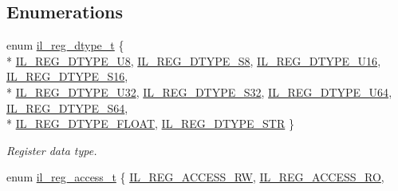 \subsection*{Enumerations}
\begin{DoxyCompactItemize}
\item 
enum \hyperlink{group__IL__REGS_gaddd7edef254d348f2e8a48c40840cdd6}{il\+\_\+reg\+\_\+dtype\+\_\+t} \{ \\*
\hyperlink{group__IL__REGS_ggaddd7edef254d348f2e8a48c40840cdd6afebd31a475c6cb6b6c9ac200fd90a09b}{I\+L\+\_\+\+R\+E\+G\+\_\+\+D\+T\+Y\+P\+E\+\_\+\+U8}, 
\hyperlink{group__IL__REGS_ggaddd7edef254d348f2e8a48c40840cdd6a4d3f76f5e0e716d7b358d819691e834a}{I\+L\+\_\+\+R\+E\+G\+\_\+\+D\+T\+Y\+P\+E\+\_\+\+S8}, 
\hyperlink{group__IL__REGS_ggaddd7edef254d348f2e8a48c40840cdd6a4776d418653151a6cadd41574d631bfa}{I\+L\+\_\+\+R\+E\+G\+\_\+\+D\+T\+Y\+P\+E\+\_\+\+U16}, 
\hyperlink{group__IL__REGS_ggaddd7edef254d348f2e8a48c40840cdd6a3eb3b654856f84234168d58355e83a85}{I\+L\+\_\+\+R\+E\+G\+\_\+\+D\+T\+Y\+P\+E\+\_\+\+S16}, 
\\*
\hyperlink{group__IL__REGS_ggaddd7edef254d348f2e8a48c40840cdd6a3d299c6c4bbda29b3286a3483271ee90}{I\+L\+\_\+\+R\+E\+G\+\_\+\+D\+T\+Y\+P\+E\+\_\+\+U32}, 
\hyperlink{group__IL__REGS_ggaddd7edef254d348f2e8a48c40840cdd6aaf16d13caf933d3e002054de7a0f1c48}{I\+L\+\_\+\+R\+E\+G\+\_\+\+D\+T\+Y\+P\+E\+\_\+\+S32}, 
\hyperlink{group__IL__REGS_ggaddd7edef254d348f2e8a48c40840cdd6a5a0f02c573b8800ee8f113160ce93712}{I\+L\+\_\+\+R\+E\+G\+\_\+\+D\+T\+Y\+P\+E\+\_\+\+U64}, 
\hyperlink{group__IL__REGS_ggaddd7edef254d348f2e8a48c40840cdd6a37398082dc9828038d3403ca24a28d5a}{I\+L\+\_\+\+R\+E\+G\+\_\+\+D\+T\+Y\+P\+E\+\_\+\+S64}, 
\\*
\hyperlink{group__IL__REGS_ggaddd7edef254d348f2e8a48c40840cdd6a07e3bbcf6a1d00d8f62887e41b529239}{I\+L\+\_\+\+R\+E\+G\+\_\+\+D\+T\+Y\+P\+E\+\_\+\+F\+L\+O\+AT}, 
\hyperlink{group__IL__REGS_ggaddd7edef254d348f2e8a48c40840cdd6aeb15ea8dd9961e96edebfc3d0f36fbd3}{I\+L\+\_\+\+R\+E\+G\+\_\+\+D\+T\+Y\+P\+E\+\_\+\+S\+TR}
 \}\begin{DoxyCompactList}\small\item\em Register data type. \end{DoxyCompactList}
\item 
enum \hyperlink{group__IL__REGS_ga4c623bd7d0d5f059dd91949c6948147e}{il\+\_\+reg\+\_\+access\+\_\+t} \{ \hyperlink{group__IL__REGS_gga4c623bd7d0d5f059dd91949c6948147eafa388eb7ec6166ba6a59d0d665f3ac53}{I\+L\+\_\+\+R\+E\+G\+\_\+\+A\+C\+C\+E\+S\+S\+\_\+\+RW}, 
\hyperlink{group__IL__REGS_gga4c623bd7d0d5f059dd91949c6948147ea12dabd43c525dfea5fb20914711168b8}{I\+L\+\_\+\+R\+E\+G\+\_\+\+A\+C\+C\+E\+S\+S\+\_\+\+RO}, 

\end{DoxyCompactItemize}
